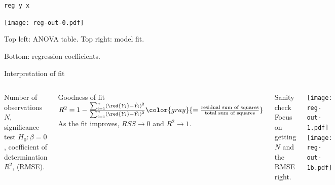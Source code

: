 \documentclass[t]{beamer}
\begin{document}
	\begin{frame}[t]{\texttt{reg y x}}

	\texttt{[image: reg-out-0.pdf]}
	
	Top left: ANOVA table. Top right: model fit.
	
	Bottom: regression coefficients.
	
	\end{frame}


	\begin{frame}[t]{Interpretation of fit}

	\begin{columns}[T]


	Number of observations $N$, significance test $H_0: \beta = 0$, coefficient of determination $R^2$,  (RMSE).\\[1em]

	\begin{block}{Goodness of fit}\vspace{.5em}
		$R^2 = 1 - \frac{\sum ^n _{i=1}(\red{Y_i} - \hat{Y_i})^2}{\sum ^n _{i=1}(\red{Y_i} - \bar{Y_i})^2} \color{gray}{ = \frac{\text{residual sum of squares}}{\text{total sum of squares}}}$\\[1em]

		As the fit improves, $RSS \to 0$ and $R^2 \to 1$.
	\end{block}

	\begin{alertblock}{Sanity check}
		Focus on getting $N$ and the RMSE right.
	\end{alertblock}

		\texttt{[image: reg-out-1.pdf]}\vspace{1cm}
		\texttt{[image: reg-out-1b.pdf]}\vspace{1cm}
	\end{columns}

	\end{frame}
\end{document}
